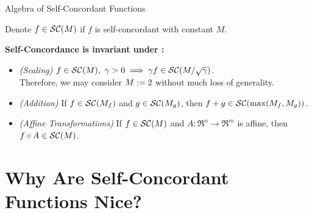 \documentclass[9pt]{beamer}
\begin{document}
\begin{frame}{Algebra of Self-Concordant Functions}

  Denote $f \in \mathcal{SC}(M)$ if $f$ is self-concordant with constant $M$.

  \vfill
  
  \textbf{Self-Concordance is invariant under :}
  \begin{itemize}
    \setlength\itemsep{1em}
  \item \emph{(Scaling)} $f \in \mathcal{SC}(M), ~\gamma> 0 \implies \gamma f\in \mathcal{SC}(M/\sqrt{\gamma})$. \\
    Therefore, we may consider \emph{$M:= 2$} without much loss of generality.\\[1em]

  \item<2-> \emph{(Addition)} If $f \in \mathcal{SC}(M_f)$ and $g \in \mathcal{SC}(M_g)$, then $f+g \in \mathcal{SC}(\max(M_f, M_g))$. \\[1em]

  \item<3-> \emph{(Affine Transformations)} If $f \in \mathcal{SC}(M)$ and $A:\Re^n \to \Re^m$ is affine, then $f \circ A \in \mathcal{SC}(M)$.
  \end{itemize}

  \vfill

\end{frame}


\section{Why Are Self-Concordant Functions Nice?}
\end{document}
